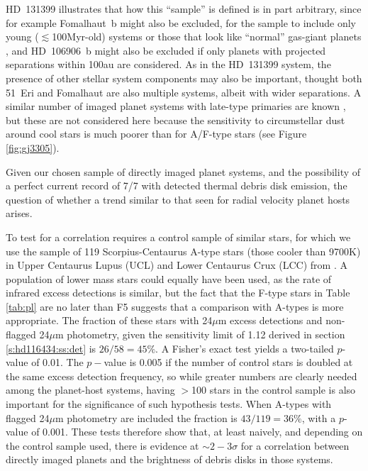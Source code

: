 \documentclass[a4paper,fleqn,usenatbib]{mnras}
\begin{document}
HD~131399 illustrates that how this ``sample'' is defined is in part
arbitrary, since for example Fomalhaut~b might also be excluded, for the
sample to include only young ($\lesssim$100Myr-old) systems or those
that look like ``normal'' gas-giant planets
\citep[see][]{2008Sci...322.1345K,
  2011MNRAS.412.2137K,2013ApJ...775...56K}, and HD~106906~b might also
be excluded if only planets with projected separations within 100au are
considered. As in the HD~131399 system, the presence of other stellar
system components may also be important, thought both 51~Eri and
Fomalhaut are also multiple systems, albeit with wider separations. A
similar number of imaged planet systems with late-type primaries are
known \citep[e.g. 2MASS J12073346-3932539,][]{2004A&A...425L..29C}, but
these are not considered here because the sensitivity to circumstellar
dust around cool stars is much poorer than for A/F-type stars (see
Figure \ref{fig:gj3305}).

Given our chosen sample of directly imaged planet systems, and the
possibility of a perfect current record of 7/7 with detected thermal
debris disk emission, the question of whether a trend similar to that
seen for radial velocity planet hosts arises.

To test for a correlation requires a control sample of similar stars,
for which we use the sample of 119 Scorpius-Centaurus A-type stars
(those cooler than 9700K) in Upper Centaurus Lupus (UCL) and Lower
Centaurus Crux (LCC) from \citet{2012ApJ...756..133C}. A population of
lower mass stars could equally have been used, as the rate of infrared
excess detections is similar, but the fact that the F-type stars in
Table \ref{tab:pl} are no later than F5 suggests that a comparison with
A-types is more appropriate. The fraction of these stars with 24$\mu$m
excess detections and non-flagged 24$\mu$m photometry, given the
sensitivity limit of 1.12 derived in section \ref{s:hd116434:ss:det} is
$26/58 = 45\%$. A Fisher's exact test yields a two-tailed $p$-value of
0.01. The $p-$value is 0.005 if the number of control stars is doubled
at the same excess detection frequency, so while greater numbers are
clearly needed among the planet-host systems, having $>$100 stars in the
control sample is also important for the significance of such hypothesis
tests. When A-types with flagged 24$\mu$m photometry are included the
fraction is $43/119 = 36\%$, with a $p$-value of 0.001. These tests
therefore show that, at least naively, and depending on the control
sample used, there is evidence at
$\sim$$2-3\sigma$ for a correlation between directly imaged planets and
the brightness of debris disks in those systems.
\end{document}
